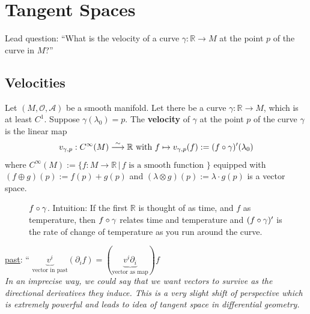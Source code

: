 \section{Tangent Spaces}
Lead question: ``What is the velocity of a curve $\gamma : \mathbb{R} \to M$ at the point $p$ of the curve in $M$?''

\subsection{Velocities}
\begin{definition} Let $(M,\mathcal{O},\mathcal{A})$ be a smooth manifold. Let there be a curve $\gamma : \mathbb{R} \to M$, which is at least $C^1$. Suppose $\gamma(\lambda_0) =p$. The \textbf{velocity} of $\gamma$ at the point $p$ of the curve $\gamma$ is the linear map \\
\begin{equation}
v_{\gamma, p} : C^{\infty}(M) \stackrel{\sim}{\longrightarrow} \mathbb{R} \text{ with }
f \mapsto v_{\gamma,p}(f):= (f \circ \gamma)^{\prime}(\lambda_0)
\end{equation}
where $C^{\infty}(M) := \lbrace f: M \to \mathbb{R} \, | \, f \text{ is a smooth function } \rbrace$ equipped with \\
$(f \oplus g)(p) := f(p) + g(p)$ and $(\lambda \otimes g)(p) := \lambda \cdot g(p)$ is a vector space.
\end{definition}

\begin{figure}
\label{fig:L5_fAfterGamma}
  \centering
    \caption{$f \circ \gamma$. Intuition: If the first $\mathbb{R}$ is thought of as time, and $f$ as temperature, then $f \circ \gamma$ relates time and temperature and $(f \circ \gamma)^\prime$ is the rate of change of temperature as you run around the curve.}
\end{figure}

\underline{past}: `` $\underbrace{v^i}_{\text{vector in past}} (\partial_i f) = (\underbrace{v^i \partial_i}_{\text{vector as map}})f$ \\
\textit{In an imprecise way, we could say that we want vectors to survive as the directional derivatives they induce. This is a very slight shift of perspective which is extremely powerful and leads to idea of tangent space in differential geometry.}

